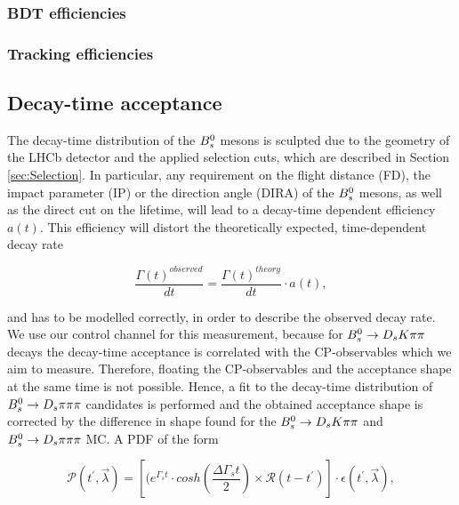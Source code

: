 \subsubsection{BDT efficiencies}


\subsubsection{Tracking efficiencies}


\clearpage

\subsection{Decay-time acceptance}
\label{sec:timeAcceptance}
The decay-time distribution of the ${{B}^0_{s}}$ mesons is sculpted due to the geometry of the LHCb detector and the applied selection cuts, which are described in Section \ref{sec:Selection}.
In particular, any requirement on the flight distance (FD), the impact parameter (IP) or the direction angle (DIRA) of the ${{B}^0_{s}}$ mesons, as well as the direct cut on the lifetime, will lead to a decay-time dependent efficiency $a(t)$. This efficiency will distort the theoretically expected, time-dependent decay rate

\begin{equation}
\frac{\Gamma(t)^{observed}}{dt} = \frac{\Gamma(t)^{theory}}{dt} \cdot a(t),
\label{eq:DecRateAcc}
\end{equation} 

and has to be modelled correctly, in order to describe the observed decay rate. We use our control channel for this measurement, because for ${{B}^0_{s}}\rightarrow{\ensuremath{{D}_{s}}}{\ensuremath{K}}{\ensuremath{\pi}}{\ensuremath{\pi}}$ decays the decay-time acceptance is correlated with the CP-observables which we aim to measure. Therefore, floating the CP-observables and the acceptance shape at the same time is not possible. 
Hence, a fit to the decay-time distribution of ${{B}^0_{s}}\rightarrow{\ensuremath{{D}_{s}}}{\ensuremath{\pi}}{\ensuremath{\pi}}{\ensuremath{\pi}}$ candidates is performed and the obtained acceptance shape is corrected by the difference in shape found for the ${{B}^0_{s}}\rightarrow{\ensuremath{{D}_{s}}}{\ensuremath{K}}{\ensuremath{\pi}}{\ensuremath{\pi}}$ and ${{B}^0_{s}}\rightarrow{\ensuremath{{D}_{s}}}{\ensuremath{\pi}}{\ensuremath{\pi}}{\ensuremath{\pi}}$ MC. \newline
A PDF of the form

\begin{equation}
\mathcal{P}(t^{'},\vec{\lambda}) = \left[ (e^{\Gamma_{s}t}\cdot cosh(\frac{\Delta\Gamma_{s}t}{2}) \times \mathcal{R}(t - t^{'})\right] \cdot \epsilon(t^{'}, \vec{\lambda}),
\label{eq:AccPDF}
\end{equation}

